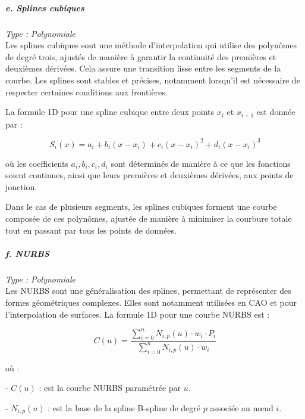 \subparagraph{e. Splines cubiques \cite{gordont1971}}
\textit{Type : Polynomiale} \\
\phantom{----}Les splines cubiques sont une méthode d'interpolation qui utilise des polynômes de degré trois, ajustés de manière à garantir la continuité des premières et deuxièmes dérivées. Cela assure une transition lisse entre les segments de la courbe. Les splines sont stables et précises, notamment lorsqu'il est nécessaire de respecter certaines conditions aux frontières.

La formule 1D pour une spline cubique entre deux points \( x_i \) et \( x_{i+1} \) est donnée par :

\vspace{-0,5 cm}

\begin{equation}
    S_i(x) = a_i + b_i(x - x_i) + c_i(x - x_i)^2 + d_i(x - x_i)^3
\end{equation}

où les coefficients \( a_i, b_i, c_i, d_i \) sont déterminés de manière à ce que les fonctions soient continues, ainsi que leurs premières et deuxièmes dérivées, aux points de jonction.

Dans le cas de plusieurs segments, les splines cubiques forment une courbe composée de ces polynômes, ajustée de manière à minimiser la courbure totale tout en passant par tous les points de données.


\subparagraph{f. NURBS \cite{surface, piegl1995nurbs}}
\textit{Type : Polynomiale} \\
\phantom{----}Les \ac{NURBS} sont une généralisation des splines, permettant de représenter des formes géométriques complexes. Elles sont notamment utilisées en CAO et pour l'interpolation de surfaces.
La formule 1D pour une courbe NURBS est :

\vspace{-0,6 cm}

\begin{equation}
    C(u) = \frac{\sum_{i=0}^{n} N_{i,p}(u) \cdot w_i \cdot P_i}{\sum_{i=0}^{n} N_{i,p}(u) \cdot w_i}
\end{equation}

\vspace{-0,4 cm}

où :

- \( C(u) \) : est la courbe NURBS paramétrée par \( u \).

\vspace{-0,2 cm}

- \( N_{i,p}(u) \) : est la base de la spline B-spline de degré \( p \) associée au nœud \( i \).

